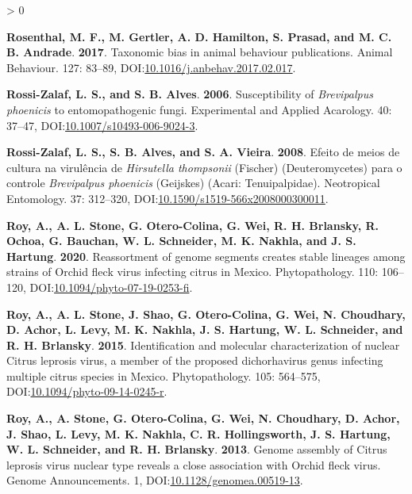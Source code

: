 \documentclass{ufdissertation}[overrideChapters] %
\newlength{\cslhangindent}
\newenvironment{CSLReferences}[2] %
 {%
  \setlength{\parindent}{0pt}
  \ifodd #1 \everypar{\setlength{\hangindent}{\cslhangindent}}\ignorespaces\fi
  \ifnum #2 > 0
  \setlength{\parskip}{#2\baselineskip}
  \fi
 }%
 {}
\begin{document}
{\begin{CSLReferences}{1}{1}
\leavevmode{}%
\textbf{Rosenthal, M. F., M. Gertler, A. D. Hamilton, S. Prasad, and M. C. B. Andrade}. \textbf{2017}. Taxonomic bias in animal behaviour publications. Animal Behaviour. 127: 83--89, DOI:\href{https://doi.org/10.1016/j.anbehav.2017.02.017}{10.1016/j.anbehav.2017.02.017}.

\leavevmode{}%
\textbf{Rossi-Zalaf, L. S., and S. B. Alves}. \textbf{2006}. Susceptibility of {\emph{Brevipalpus phoenicis}} to entomopathogenic fungi. Experimental and Applied Acarology. 40: 37--47, DOI:\href{https://doi.org/10.1007/s10493-006-9024-3}{10.1007/s10493-006-9024-3}.

\leavevmode{}%
\textbf{Rossi-Zalaf, L. S., S. B. Alves, and S. A. Vieira}. \textbf{2008}. Efeito de meios de cultura na virul{ê}ncia de {\emph{Hirsutella thompsonii}} ({Fischer}) ({Deuteromycetes}) para o controle {\emph{Brevipalpus phoenicis}} ({Geijskes}) ({Acari}: {Tenuipalpidae}). Neotropical Entomology. 37: 312--320, DOI:\href{https://doi.org/10.1590/s1519-566x2008000300011}{10.1590/s1519-566x2008000300011}.

\leavevmode{}%
\textbf{Roy, A., A. L. Stone, G. Otero-Colina, G. Wei, R. H. Brlansky, R. Ochoa, G. Bauchan, W. L. Schneider, M. K. Nakhla, and J. S. Hartung}. \textbf{2020}. Reassortment of genome segments creates stable lineages among strains of {Orchid fleck virus} infecting citrus in {Mexico}. Phytopathology{\textregistered}. 110: 106--120, DOI:\href{https://doi.org/10.1094/phyto-07-19-0253-fi}{10.1094/phyto-07-19-0253-fi}.

\leavevmode{}%
\textbf{Roy, A., A. L. Stone, J. Shao, G. Otero-Colina, G. Wei, N. Choudhary, D. Achor, L. Levy, M. K. Nakhla, J. S. Hartung, W. L. Schneider, and R. H. Brlansky}. \textbf{2015}. Identification and molecular characterization of nuclear {Citrus leprosis virus}, a member of the proposed dichorhavirus genus infecting multiple citrus species in {Mexico}. Phytopathology{\textregistered}. 105: 564--575, DOI:\href{https://doi.org/10.1094/phyto-09-14-0245-r}{10.1094/phyto-09-14-0245-r}.

\leavevmode{}%
\textbf{Roy, A., A. Stone, G. Otero-Colina, G. Wei, N. Choudhary, D. Achor, J. Shao, L. Levy, M. K. Nakhla, C. R. Hollingsworth, J. S. Hartung, W. L. Schneider, and R. H. Brlansky}. \textbf{2013}. Genome assembly of {Citrus leprosis virus} nuclear type reveals a close association with {Orchid fleck virus}. Genome Announcements. 1, DOI:\href{https://doi.org/10.1128/genomea.00519-13}{10.1128/genomea.00519-13}.


\end{CSLReferences}}
\end{document}
